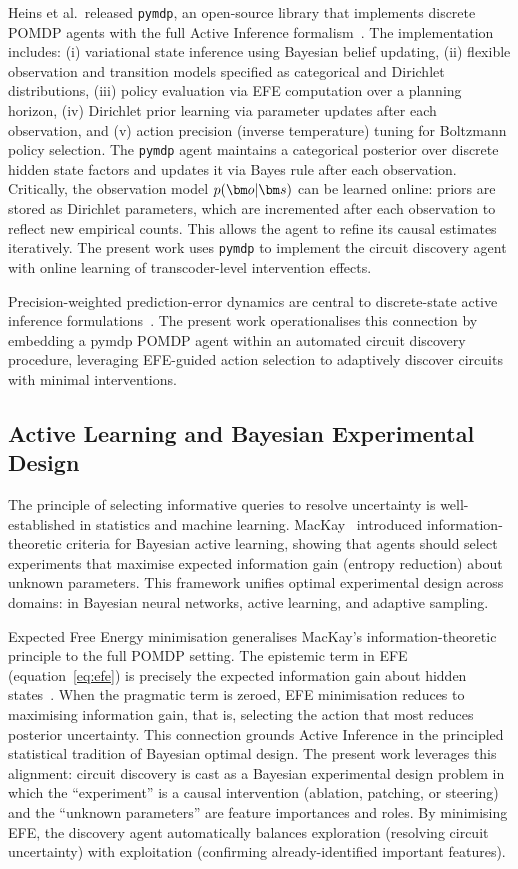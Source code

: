 Heins et al.\ released \texttt{pymdp}, an open-source library that implements discrete
POMDP agents with the full Active Inference formalism~\cite{Pymdp2022}. The
implementation includes: (i) variational state inference using Bayesian belief
updating, (ii) flexible observation and transition models specified as categorical and
Dirichlet distributions, (iii) policy evaluation via EFE computation over a planning
horizon, (iv) Dirichlet prior learning via parameter updates after each observation,
and (v) action precision (inverse temperature) tuning for Boltzmann policy selection.
The \texttt{pymdp} agent maintains a categorical posterior over discrete hidden state
factors and updates it via Bayes rule after each observation. Critically, the
observation model $p(\vect{o}|\vect{s})$ can be learned online: priors are stored as
Dirichlet parameters, which are incremented after each observation to reflect new
empirical counts. This allows the agent to refine its causal estimates iteratively.
The present work uses \texttt{pymdp} to implement the circuit discovery agent with
online learning of transcoder-level intervention effects.

Precision-weighted prediction-error dynamics are central to discrete-state active
inference formulations~\cite{Friston2017,DaCosta2020}. The present work operationalises
this connection by embedding a pymdp POMDP agent within an automated circuit discovery
procedure, leveraging EFE-guided action selection to adaptively discover circuits
with minimal interventions.

\subsection{Active Learning and Bayesian Experimental Design}

The principle of selecting informative queries to resolve uncertainty is well-
established in statistics and machine learning. MacKay~\cite{MacKay2003} introduced
information-theoretic criteria for Bayesian active learning, showing that agents
should select experiments that maximise expected information gain (entropy reduction)
about unknown parameters. This framework unifies optimal experimental design across
domains: in Bayesian neural networks, active learning, and adaptive sampling.

Expected Free Energy minimisation generalises MacKay's information-theoretic principle
to the full POMDP setting. The epistemic term in EFE (equation~\ref{eq:efe}) is
precisely the expected information gain about hidden states~\cite{Friston2015,DaCosta2020}.
When the pragmatic term is zeroed, EFE minimisation reduces to maximising information
gain, that is, selecting the action that most reduces posterior uncertainty. This
connection grounds Active Inference in the principled statistical tradition of Bayesian
optimal design. The present work leverages this alignment: circuit discovery is cast as
a Bayesian experimental design problem in which the ``experiment'' is a causal
intervention (ablation, patching, or steering) and the ``unknown parameters'' are
feature importances and roles. By minimising EFE, the discovery agent automatically
balances exploration (resolving circuit uncertainty) with exploitation (confirming
already-identified important features).

